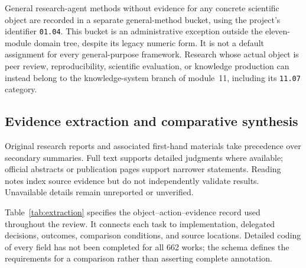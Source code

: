 General research-agent methods without evidence for any concrete scientific object are recorded in a separate general-method bucket, using the project's identifier \texttt{01.04}. This bucket is an administrative exception outside the eleven-module domain tree, despite its legacy numeric form. It is not a default assignment for every general-purpose framework. Research whose actual object is peer review, reproducibility, scientific evaluation, or knowledge production can instead belong to the knowledge-system branch of module~11, including its \texttt{11.07} category.

\subsection{Evidence extraction and comparative synthesis}

Original research reports and associated first-hand materials take precedence over secondary summaries. Full text supports detailed judgments where available; official abstracts or publication pages support narrower statements. Reading notes index source evidence but do not independently validate results. Unavailable details remain unreported or unverified.

Table~\ref{tab:extraction} specifies the object--action--evidence record used throughout the review. It connects each task to implementation, delegated decisions, outcomes, comparison conditions, and source locations. Detailed coding of every field has not been completed for all 662 works; the schema defines the requirements for a comparison rather than asserting complete annotation.

